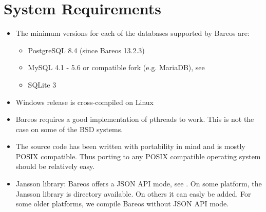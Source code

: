 
\chapter{System Requirements}
\label{SysReqs}

\begin{itemize}
\item The minimum versions for each of the databases supported by Bareos
   are:
   \begin{itemize}
   \item PostgreSQL 8.4 (since Bareos 13.2.3)
   \item MySQL 4.1 - 5.6 or compatible fork (e.g. MariaDB), see 
   \item SQLite 3
   \end{itemize}
\item Windows release is cross-compiled on Linux
\item Bareos requires a good implementation of pthreads to work.  This
   is not the case on some of the BSD systems.
\item The source code has been written with portability in mind and is  mostly
   POSIX compatible. Thus porting to any POSIX compatible  operating system
   should be relatively easy.
\item Jansson library:
    \label{jansson}
    Bareos  offers a JSON API mode, see \bareosDeveloperGuideApiModeJson. On some platform, the Jansson library is directory available. On others it can easly be added. For some older platforms, we compile Bareos without JSON API mode.
\end{itemize}
